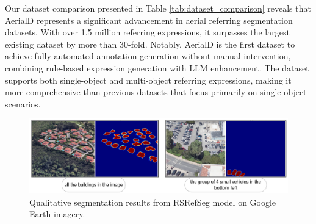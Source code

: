 \begin{table}[H]
\centering
\caption{Comparison with Existing RRSIS Datasets}
\label{tab:dataset_comparison}
\end{table}

Our dataset comparison presented in Table \ref{tab:dataset_comparison} reveals that AerialD represents a significant advancement in aerial referring segmentation datasets. With over 1.5 million referring expressions, it surpasses the largest existing dataset by more than 30-fold. Notably, AerialD is the first dataset to achieve fully automated annotation generation without manual intervention, combining rule-based expression generation with LLM enhancement. The dataset supports both single-object and multi-object referring expressions, making it more comprehensive than previous datasets that focus primarily on single-object scenarios.

\begin{figure}[H]
\centering
\includegraphics[width=\textwidth]{Images/qualitative.png}
\caption{Qualitative segmentation results from RSRefSeg model on Google Earth imagery.}
\label{fig:qualitative_examples}
\end{figure}

